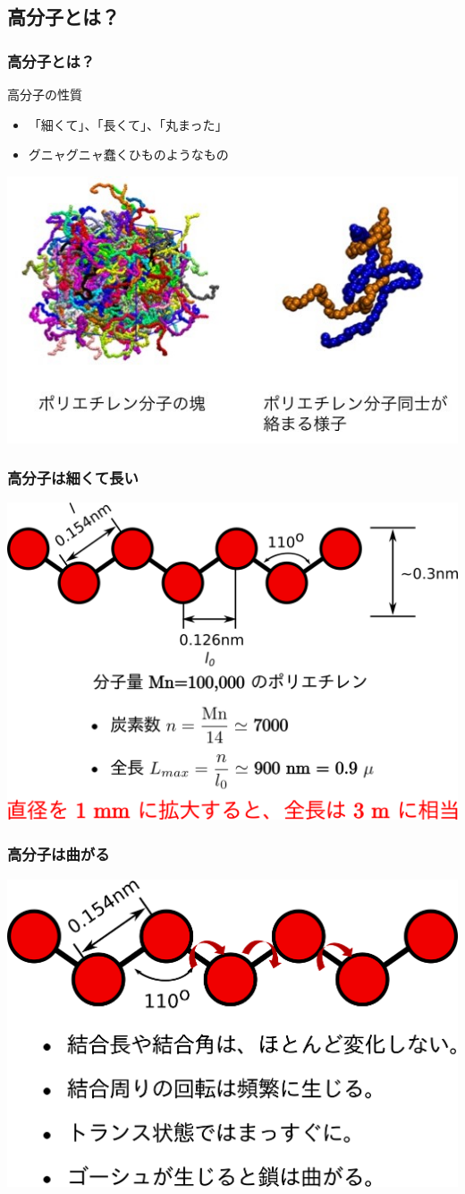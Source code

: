 \documentclass[12pt, dvipdfmx]{beamer}
\begin{document}
\subsection{高分子とは？}
\begin{frame}
	\frametitle{高分子とは？}
		\begin{block}{高分子の性質}
			\begin{itemize}
				\item 「細くて」、「⻑くて」、「丸まった」
				\item グニャグニャ蠢くひものようなもの
			\end{itemize}
		\end{block}
		\centering
		\includegraphics[width=.8\textwidth]{polymer_image.jpg}
\end{frame}

\begin{frame}
	\frametitle{高分子は細くて長い}
	\centering
	\includegraphics[width=.8\textwidth]{polymer_model.png}
\end{frame}

\begin{frame}
	\frametitle{高分子は曲がる}
	\centering
	\includegraphics[width=.8\textwidth]{polymer_model_2.png}
\end{frame}
\end{document}
